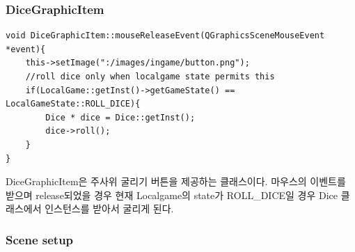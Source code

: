 \documentclass[10pt,oneside,a4paper,titlepage]{article}
\begin{document}
\subsubsection{DiceGraphicItem}

\begin{lstlisting}[frame=single,caption=
{DiceGraphicItem mouseReleaseEvent},label=code:FD,captionpos=b,framexleftmargin=10pt,escapeinside=~~]
void DiceGraphicItem::mouseReleaseEvent(QGraphicsSceneMouseEvent *event){
    this->setImage(":/images/ingame/button.png");
    //roll dice only when localgame state permits this
    if(LocalGame::getInst()->getGameState() == LocalGameState::ROLL_DICE){
        Dice * dice = Dice::getInst();
        dice->roll();
    }
}    
\end{lstlisting}

DiceGraphicItem은 주사위 굴리기 버튼을 제공하는 클래스이다. 마우스의 이벤트를 받으며 release되었을 경우 현재 Localgame의 state가 ROLL\_DICE일 경우 Dice 클래스에서 인스턴스를 받아서 굴리게 된다. 

\subsubsection{Scene setup}
\end{document}
